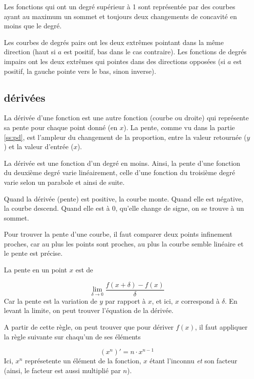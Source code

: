 \documentclass[a4paper]{article}
\begin{document}
    Les fonctions qui ont un degré supérieur à 1 sont représentée par
    des courbes ayant au maximum un sommet et toujours deux changements de
    concavité en moins que le degré. 
    

    Les courbes de degrés pairs ont les deux extrêmes pointant dans la même
    direction (haut si $a$ est positif, bas dans le cas contraire). Les
    fonctions de degrés impairs ont les deux extrêmes qui pointes dans des
    directions opposées (si $a$ est positif, la gauche pointe vers le bas, sinon
    inverse).

    \subsection{dérivées}
    La dérivée d'une fonction est une autre fonction (courbe ou droite) qui
    représente sa pente pour chaque point donné (en $x$). La pente, comme vu
    dans la partie \ref{ss:pd}, est l'ampleur du changement de la proportion,
    entre la valeur retournée ($y$) et la valeur d'entrée ($x$).

    La dérivée est une fonction d'un degré en moins. Ainsi, la pente d'une
    fonction du deuxième degré varie linéairement, celle d'une fonction du
    troisième degré varie selon un parabole et ainsi de suite.

    Quand la dérivée (pente) est positive, la courbe monte. Quand elle est
    négative, la courbe descend. Quand elle est à $0$, qu'elle change de
    signe, on se trouve à un sommet.

    Pour trouver la pente d'une courbe, il faut comparer deux points infinement
    proches, car au plus les points sont proches, au plus la courbe semble
    linéaire et le pente est précise. 

    La pente en un point $x$ est de 

    \begin{equation}\label{eq:derivbase}
        \lim_{\delta \to 0} \frac{f(x + \delta ) - f(x)}{\delta}
    \end{equation}
    \noindent Car la pente est la variation de $y$ par rapport à $x$, et ici,
    $x$ correspond à $\delta$. En levant la limite, on peut trouver l'équation
    de la dérivée.

    A partir de cette règle, on peut trouver que pour dériver $f(x)$, il faut
    appliquer la règle suivante sur chaqu'un de ses éléments 

    \begin{equation}\label{eq:derivutil}
        (x^{n})' = n \cdot x^{n - 1}
    \end{equation}
    \noindent Ici, $x^n$ représetente un élément de la fonction, $x$ étant
    l'inconnu \emph{et} son facteur (ainsi, le facteur est aussi multiplié par
    $n$). 
    
\end{document}
